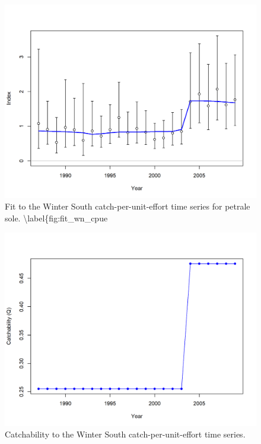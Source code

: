\documentclass[12pt,]{article}
\begin{document}
\FloatBarrier

\begin{figure}
\centering
\includegraphics{r4ss/plots_mod1/index2_cpuefit_Winter (S).png}
\caption{Fit to the Winter South catch-per-unit-effort time series for
petrale sole. \textbackslash{}label\{fig:fit\_wn\_cpue}
\end{figure}

\FloatBarrier

\begin{figure}
\centering
\includegraphics{r4ss/plots_mod1/index7_timevaryingQ_Winter (S).png}
\caption{Catchability to the Winter South catch-per-unit-effort time
series. \label{fig:q_south}}
\end{figure}
\end{document}
